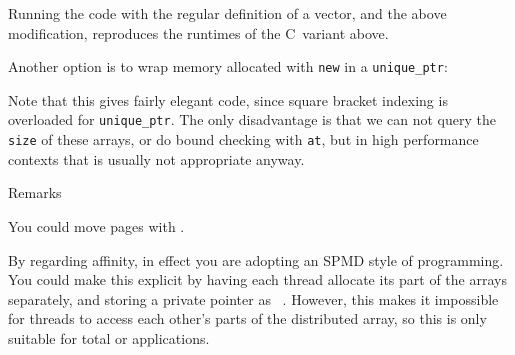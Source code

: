 Running the code with the regular definition of a vector,
and the above modification,
reproduces the runtimes of the C~variant above.

Another option is to wrap memory allocated with \lstinline{new}
in a \lstinline{unique_ptr}:
%

Note that this gives fairly elegant code,
since square bracket indexing is overloaded for \lstinline+unique_ptr+.
The only disadvantage is that we can not query the \lstinline{size}
of these arrays, or do bound checking with \lstinline{at},
but in high performance contexts that is usually not appropriate anyway.


\lstset{language=C}

\begin{comment}
\begin{exercise}
  \label{ex:first-touch}
  Finish the following fragment and run it with first all the cores of
  one socket, then all cores of both sockets. (If you know how to do
  explicit placement, you can also try fewer cores.)
\begin{lstlisting}[language=omp]
  for (int i=0; i<nlocal+2; i++)
    in[i] = 1.;
  for (int i=0; i<nlocal; i++)
    out[i] = 0.;

  for (int step=0; step<nsteps; step++) {
#pragma omp parallel for schedule(static)
    for (int i=0; i<nlocal; i++) {
      out[i] = ( in[i]+in[i+1]+in[i+2] )/3.;
    }
#pragma omp parallel for schedule(static)
    for (int i=0; i<nlocal; i++)
      in[i+1] = out[i];
    in[0] = 0; in[nlocal+1] = 1;
  }
\end{lstlisting}
\end{exercise}
\end{comment}

 {Remarks}

You could move pages with .

By regarding affinity,
in effect you are adopting an \ac{SPMD} style of programming.
You could make this explicit by having each thread allocate its part
of the arrays separately, and storing a private pointer as
~\cite{Liu:2003:OMP-SPMD}. However, this
makes it impossible for threads to access each other's parts of the
distributed array, so this is only suitable for
total  or
 applications.


